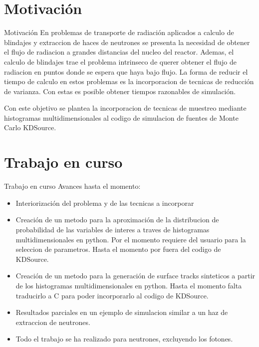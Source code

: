 \documentclass[aspectratio=169,english]{beamer}
\begin{document}
\section{Motivación}
\begin{frame}{Motivación}
    En problemas de transporte de radiación aplicados a calculo de blindajes y extraccion de 
    haces de neutrones se presenta la necesidad de obtener el flujo de radiacion a grandes 
    distancias del nucleo del reactor. Ademas, el calculo de blindajes trae el problema intrinseco 
    de querer obtener el flujo de radiacion en puntos donde se espera que haya bajo flujo.
    La forma de reducir el tiempo de calculo en estos problemas es la incorporacion de tecnicas de 
    reducción de varianza. Con estas es posible obtener tiempos razonables de simulación.
    
    Con este objetivo se plantea la incorporacion de tecnicas de muestreo mediante histogramas 
    multidimensionales al codigo de simulacion de fuentes de Monte Carlo KDSource.
\end{frame}

\section{Trabajo en curso}
\begin{frame}{Trabajo en curso}
    Avances hasta el momento:
    \begin{itemize}
        \item Interiorización del problema y de las tecnicas a incorporar
        \item Creación de un metodo para la aproximación de la distribucion de probabilidad de las variables de interes a traves de histogramas multidimensionales en python. Por el momento requiere del usuario para la seleccion de parametros. Hasta el momento por fuera del codigo de KDSource. 
        \item Creación de un metodo para la generación de surface tracks sinteticos a partir de los histogramas multidimensionales en python. Hasta el momento falta traducirlo a C para poder incorporarlo al codigo de KDSource.
        \item Resultados parciales en un ejemplo de simulacion similar a un haz de extraccion de neutrones.
        \item Todo el trabajo se ha realizado para neutrones, excluyendo los fotones.
    \end{itemize}

\end{frame}
\end{document}
